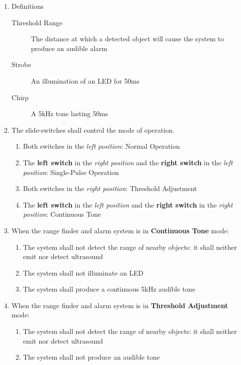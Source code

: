 \begin{enumerate}
    \item Definitions
        \begin{description}
            \item[Threshold Range] The distance at which a detected object will cause the system to produce an audible alarm
            \item[Strobe] An illumination of an LED for 50ms
            \item[Chirp] A 5kHz tone lasting 50ms
        \end{description}
    \item \label{spec:modes} The slide-switches shall control the mode of operation.
        \begin{enumerate}
            \item Both switches in the \textit{left position}: Normal Operation
            \item The \textbf{left switch} in the \textit{right position} and the \textbf{right switch} in the \textit{left position}: Single-Pulse Operation
            \item Both switches in the \textit{right position}: Threshold Adjustment
            \item The \textbf{left switch} in the \textit{left position} and the \textbf{right switch} in the \textit{right position}: Continuous Tone
        \end{enumerate}
    \item \label{spec:continuousTone} When the range finder and alarm system is in \textbf{Continuous Tone} mode:
        \begin{enumerate}
            \item The system shall not detect the range of nearby objects: it shall neither emit nor detect ultrasound
            \item The system shall not illuminate an LED
            \item The system shall produce a continuous 5kHz audible tone
        \end{enumerate}
    \item \label{spec:thresholdAdjustment} When the range finder and alarm system is in \textbf{Threshold Adjustment} mode:
        \begin{enumerate}
            \item The system shall not detect the range of nearby objects: it shall neither emit nor detect ultrasound
            \item The system shall not produce an audible tone

\end{enumerate}
\end{enumerate}
